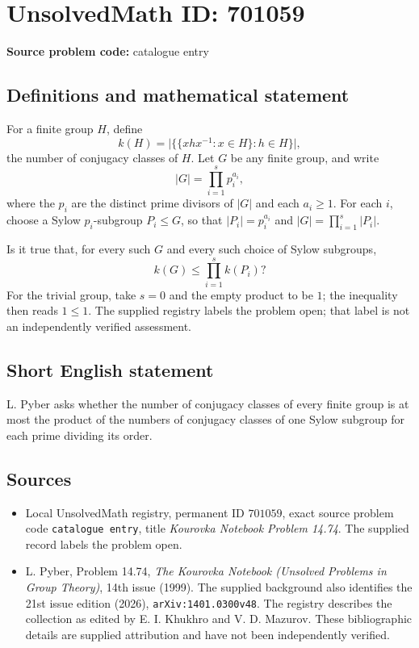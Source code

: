 \documentclass[11pt]{article}
\begin{document}
\section*{UnsolvedMath ID: 701059}
\textbf{Source problem code:} catalogue entry
\subsection{Definitions and mathematical statement}
For a finite group \(H\), define
\[
k(H)=\bigl|\{\{xhx^{-1}:x\in H\}:h\in H\}\bigr|,
\]
the number of conjugacy classes of \(H\). Let \(G\) be any finite group, and write
\[
|G|=\prod_{i=1}^{s}p_i^{a_i},
\]
where the \(p_i\) are the distinct prime divisors of \(|G|\) and each \(a_i\geq 1\). For each \(i\), choose a Sylow \(p_i\)-subgroup \(P_i\leq G\), so that \(|P_i|=p_i^{a_i}\) and \(|G|=\prod_{i=1}^{s}|P_i|\).

Is it true that, for every such \(G\) and every such choice of Sylow subgroups,
\[
k(G)\leq\prod_{i=1}^{s}k(P_i)?
\]
For the trivial group, take \(s=0\) and the empty product to be \(1\); the inequality then reads \(1\leq 1\). The supplied registry labels the problem open; that label is not an independently verified assessment.
\subsection{Short English statement}
L. Pyber asks whether the number of conjugacy classes of every finite group is at most the product of the numbers of conjugacy classes of one Sylow subgroup for each prime dividing its order.
\subsection{Sources}
\begin{itemize}
\item Local UnsolvedMath registry, permanent ID \(701059\), exact source problem code \texttt{catalogue entry}, title \emph{Kourovka Notebook Problem 14.74}. The supplied record labels the problem open.
\item L. Pyber, Problem 14.74, \emph{The Kourovka Notebook (Unsolved Problems in Group Theory)}, 14th issue (1999). The supplied background also identifies the 21st issue edition (2026), \texttt{arXiv:1401.0300v48}. The registry describes the collection as edited by E. I. Khukhro and V. D. Mazurov. These bibliographic details are supplied attribution and have not been independently verified.
\end{itemize}
\end{document}

